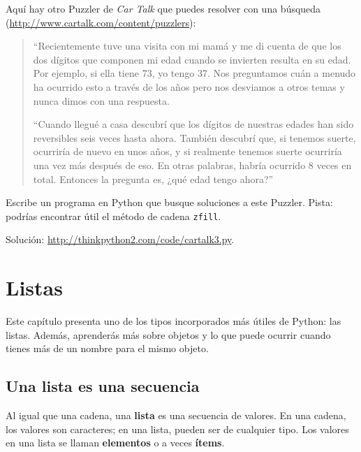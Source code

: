 \documentclass[10pt]{book}
\begin{document}
\begin{exercise}
Aquí hay otro Puzzler de {\em Car Talk} que puedes resolver con una
búsqueda (\url{http://www.cartalk.com/content/puzzlers}):

\begin{quote}
``Recientemente tuve una visita con mi mamá y me di cuenta de que
los dos dígitos que componen mi edad cuando se invierten resulta en su
edad. Por ejemplo, si ella tiene 73, yo tengo 37. Nos preguntamos cuán a menudo ha
ocurrido esto a través de los años pero nos desviamos a otros temas y
nunca dimos con una respuesta.

``Cuando llegué a casa descubrí que los dígitos de nuestras edades han sido
reversibles seis veces hasta ahora. También descubrí que, si tenemos suerte,
ocurriría de nuevo en unos años, y si realmente tenemos suerte
ocurriría una vez más después de eso. En otras palabras, habría
ocurrido 8 veces en total. Entonces la pregunta es, ¿qué edad tengo ahora?''

\end{quote}

Escribe un programa en Python que busque soluciones a este Puzzler.
Pista: podrías encontrar útil el método de cadena {\tt zfill}.

Solución: \url{http://thinkpython2.com/code/cartalk3.py}.

\end{exercise}



\chapter{Listas}

Este capítulo presenta uno de los tipos incorporados más útiles de Python: las listas.
Además, aprenderás más sobre objetos y lo que puede ocurrir cuando tienes
más de un nombre para el mismo objeto.


\section{Una lista es una secuencia}
\label{sequence}

Al igual que una cadena, una {\bf lista} es una secuencia de valores.  En una cadena, los
valores son caracteres; en una lista, pueden ser de cualquier tipo.  Los valores en
una lista se llaman {\bf elementos} o a veces {\bf ítems}.
\end{document}
